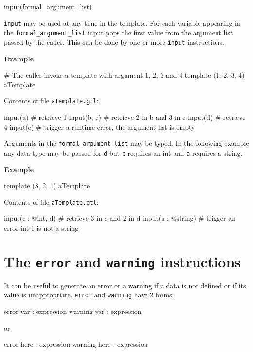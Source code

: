 \documentclass[10pt,openright,twosides]{report}
\newcommand{\gtltype}[1]{{\small\ttfamily #1}}
\newcommand{\gtlinline}[1]{\colorbox{light-blue}{\lstinline[language=gtl]{#1}}}
\newcommand{\example}{\vspace{.75em}\noindent\textbf{Example}\vspace{0em}}
\begin{document}
\begin{gtl}
input(formal_argument_list)
\end{gtl}

\gtlinline{input} may be used at any time in the template. For each variable appearing in the \gtlinline{formal_argument_list} input pops the first value from the argument list passed by the caller. This can be done by one or more \gtlinline{input} instructions.

\example
\begin{gtl}
# The caller invoke a template with argument 1, 2, 3 and 4
template (1, 2, 3, 4) aTemplate
\end{gtl}
\noindent Contents of file \texttt{\small aTemplate.gtl}:
\begin{gtl}
input(a)    # retrieve 1
input(b, c) # retrieve 2 in b and 3 in c
input(d)    # retrieve 4
input(e)    # trigger a runtime error, the argument list is empty
\end{gtl}

Arguments in the \gtlinline{formal_argument_list} may be typed. In the following example any data type may be passed for \gtlinline{d} but \gtlinline{c} requires an \gtltype{int} and \gtlinline{a} requires a \gtltype{string}.

\example
\begin{gtl}
template (3, 2, 1) aTemplate
\end{gtl}
\noindent Contents of file \texttt{\small aTemplate.gtl}:
\begin{gtl}
input(c : @int, d) # retrieve 3 in c and 2 in d
input(a : @string) # trigger an error int 1 is not a string
\end{gtl}

\section{The \texttt{error} and \texttt{warning} instructions}
\label{sec:errorInstruction}
\label{sec:warningInstruction}

It can be useful to generate an error or a warning if a data is not defined or if its value is unappropriate.  \gtlinline{error} and \gtlinline{warning} have 2 forms:

\begin{gtl}
error var : expression
warning var : expression
\end{gtl}

\noindent or

\begin{gtl}
error here : expression
warning here : expression
\end{gtl}
\end{document}
